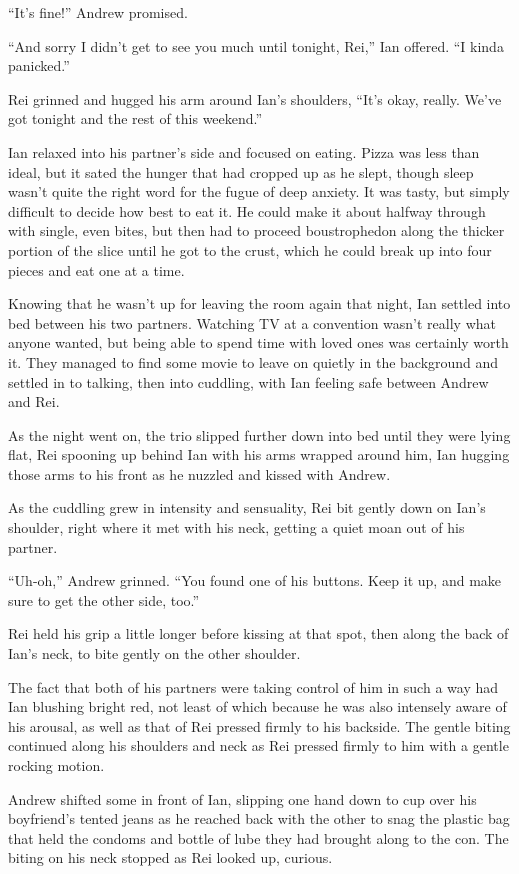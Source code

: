 ``It's fine!'' Andrew promised.

``And sorry I didn't get to see you much until tonight, Rei,'' Ian offered. ``I kinda panicked.''

Rei grinned and hugged his arm around Ian's shoulders, ``It's okay, really. We've got tonight and the rest of this weekend.''

Ian relaxed into his partner's side and focused on eating. Pizza was less than ideal, but it sated the hunger that had cropped up as he slept, though sleep wasn't quite the right word for the fugue of deep anxiety. It was tasty, but simply difficult to decide how best to eat it. He could make it about halfway through with single, even bites, but then had to proceed boustrophedon along the thicker portion of the slice until he got to the crust, which he could break up into four pieces and eat one at a time.

Knowing that he wasn't up for leaving the room again that night, Ian settled into bed between his two partners. Watching TV at a convention wasn't really what anyone wanted, but being able to spend time with loved ones was certainly worth it. They managed to find some movie to leave on quietly in the background and settled in to talking, then into cuddling, with Ian feeling safe between Andrew and Rei.

As the night went on, the trio slipped further down into bed until they were lying flat, Rei spooning up behind Ian with his arms wrapped around him, Ian hugging those arms to his front as he nuzzled and kissed with Andrew.

As the cuddling grew in intensity and sensuality, Rei bit gently down on Ian's shoulder, right where it met with his neck, getting a quiet moan out of his partner.

``Uh-oh,'' Andrew grinned. ``You found one of his buttons. Keep it up, and make sure to get the other side, too.''

Rei held his grip a little longer before kissing at that spot, then along the back of Ian's neck, to bite gently on the other shoulder.

The fact that both of his partners were taking control of him in such a way had Ian blushing bright red, not least of which because he was also intensely aware of his arousal, as well as that of Rei pressed firmly to his backside. The gentle biting continued along his shoulders and neck as Rei pressed firmly to him with a gentle rocking motion.

Andrew shifted some in front of Ian, slipping one hand down to cup over his boyfriend's tented jeans as he reached back with the other to snag the plastic bag that held the condoms and bottle of lube they had brought along to the con. The biting on his neck stopped as Rei looked up, curious.

